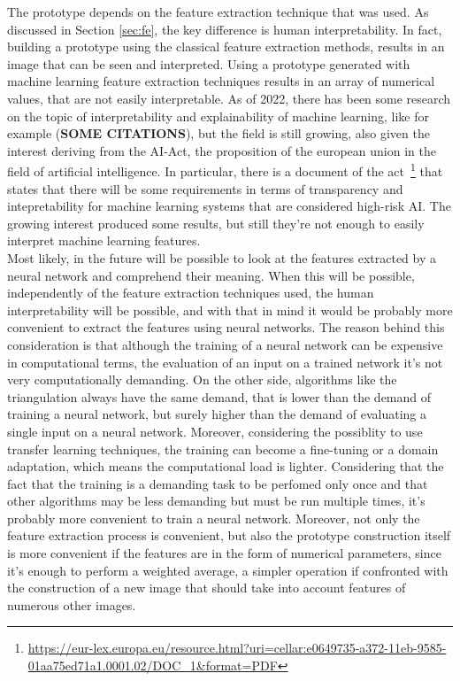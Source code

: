 \documentclass[conference]{IEEEtran}
\begin{document}
			The prototype depends on the feature extraction technique that was used. As discussed in Section \ref{sec:fe}, the key difference is human interpretability. In fact, building a prototype using the 
			classical feature extraction methods, results in an image that can be seen and interpreted. Using a prototype generated with machine learning feature extraction techniques results in an array 
			of numerical values, that are not easily interpretable. As of 2022, there has been some research on the topic of interpretability and explainability of machine learning, like for example 
			(\textbf{SOME CITATIONS}),
			but the field is still growing, also given the interest deriving from the AI-Act, the proposition of the european union in the field of artificial intelligence. In particular, there is a document of 
			the act~\footnote{\url{https://eur-lex.europa.eu/resource.html?uri=cellar:e0649735-a372-11eb-9585-01aa75ed71a1.0001.02/DOC_1&format=PDF}} that states that there will be some requirements in terms of 
			transparency and intepretability for machine learning systems that are considered high-risk AI. The growing interest produced some results, but still they're not enough to easily interpret machine learning 
			features.\\
			Most likely, in the future will be possible to look at the features extracted by a neural network and comprehend their meaning. When this will be possible, independently of the feature extraction techniques 
			used, the human interpretability will be possible, and with that in mind it would be probably more convenient to extract the features using neural networks. The reason behind this consideration is 
			that although the training of a neural network can be expensive in computational terms, the evaluation of an input on a trained network it's not very computationally demanding. On the other side, algorithms 
			like the triangulation always have the same demand, that is lower than the demand of training a neural network, but surely higher than the demand of evaluating a single input on a neural network. 
			Moreover, considering the possiblity to use transfer learning techniques, the training can become a fine-tuning or a domain adaptation, which means the computational load is lighter. Considering that 
			the fact that the training is a demanding task to be perfomed only once and that other algorithms may be less demanding but must be run multiple times, it's probably more convenient to train a neural 
			network. Moreover, not only the feature extraction process is convenient, but also the prototype construction itself is more convenient if the features are in the form of numerical parameters, since it's 
			enough to perform a weighted average, a simpler operation if confronted with the construction of a new image that should take into account features of numerous other images. 



	\nocite{*}
	\printbibliography
\end{document}
